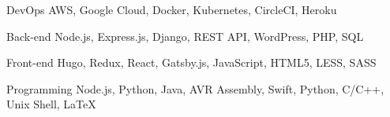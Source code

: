 \begin{cvskills}
  \cvskill
    {DevOps} %
    {AWS, Google Cloud, Docker, Kubernetes, CircleCI, Heroku} %

  \cvskill
    {Back-end} %
    {Node.js, Express.js, Django, REST API, WordPress, PHP, SQL} %

  \cvskill
    {Front-end} %
    {Hugo, Redux, React, Gatsby.js, JavaScript, HTML5, LESS, SASS} %

  \cvskill
    {Programming} %
    {Node.js, Python, Java, AVR Assembly, Swift, Python, C/C++, Unix Shell, LaTeX} %


\end{cvskills}
